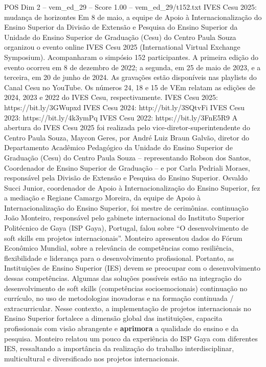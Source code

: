 \begin{textsample}{POS Dim 2 – vem\_ed\_29 – Score 1.00 – vem\_ed\_29/t152.txt}  \label{ex:f2_pos_010}
IVES Cesu 2025: mudança de horizontes Em 8 de maio, a equipe de Apoio à Internacionalização do Ensino Superior da Divisão de Extensão e Pesquisa do Ensino Superior da Unidade do Ensino Superior de Graduação (Cesu) do Centro Paula Souza organizou o evento online IVES Cesu 2025 (International Virtual Exchange Symposium).
Acompanharam o simpósio 152 participantes.
A primeira edição do evento ocorreu em 8 de dezembro de 2022; a segunda, em 25 de maio de 2023, e a terceira, em 20 de junho de 2024.
As gravações estão disponíveis nas playlists do Canal Cesu no YouTube.
Os números 24, 18 e 15 de VEm relatam as edições de 2024, 2023 e 2022 do IVES Cesu, respectivamente.
IVES Cesu 2025: https://bit.ly/3GWupxd IVES Cesu 2024: http://bit.ly/3SQtvFi IVES Cesu 2023: https://bit.ly/4k3ymPq IVES Cesu 2022: https://bit.ly/3FnE5R9 A abertura do IVES Cesu 2025 foi realizada pelo vice-diretor-superintendente do Centro Paula Souza, Maycon Geres, por André Luiz Braun Galvão, diretor do Departamento Acadêmico Pedagógico da Unidade do Ensino Superior de Graduação (Cesu) do Centro Paula Souza – representando Robson dos Santos, Coordenador de Ensino Superior de Graduação – e por Carla Pedriali Moraes, responsável pela Divisão de Extensão e Pesquisa do Ensino Superior.
Osvaldo Succi Junior, coordenador de Apoio à Internacionalização do Ensino Superior, fez a mediação e Regiane Camargo Moreira, da equipe de Apoio à Internacionalização do Ensino Superior, foi mestre de cerimônias. continuação João Monteiro, responsável pelo gabinete internacional do Instituto Superior Politécnico de Gaya (ISP Gaya), Portugal, falou sobre “O desenvolvimento de soft skills em projetos internacionais”.
Monteiro apresentou dados do Fórum Econômico Mundial, sobre a relevância de competências como resiliência, flexibilidade e liderança para o desenvolvimento profissional.
Portanto, as Instituições de Ensino Superior (IES) devem se preocupar com o desenvolvimento dessas competências.
Algumas das soluções possíveis estão na integração do desenvolvimento de soft skills (competências socioemocionais) continuação no currículo, no uso de metodologias inovadoras e na formação continuada / extracurricular.
Nesse contexto, a implementação de projetos internacionais no Ensino Superior fortalece a dimensão global das instituições, capacita profissionais com visão abrangente e \textbf{aprimora} a qualidade do ensino e da pesquisa.
Monteiro relatou um pouco da experiência do ISP Gaya com diferentes IES, ressaltando a importância da realização do trabalho interdisciplinar, multicultural e diversificado nos projetos internacionais.

\end{textsample}
